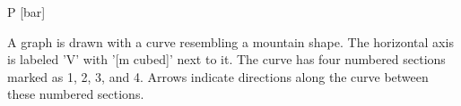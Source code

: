 P [bar]

A graph is drawn with a curve resembling a mountain shape. The horizontal axis is labeled 'V' with '[m cubed]' next to it. The curve has four numbered sections marked as 1, 2, 3, and 4. Arrows indicate directions along the curve between these numbered sections.